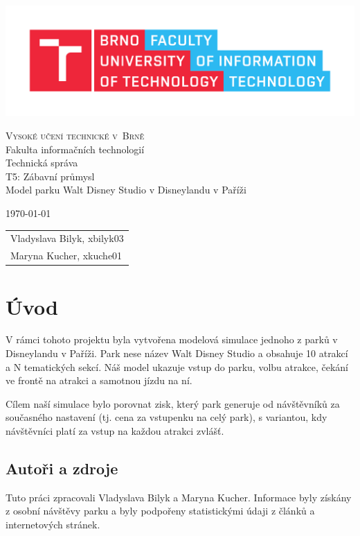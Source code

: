 \documentclass[a4paper,12pt]{article}
\begin{document}
\begin{center}
\includegraphics[width=1.0\textwidth]{fit.pdf} %

    \vspace{0.5cm} 
\Huge
\textsc{Vysoké učení technické v~Brně\\
}Fakulta informačních technologií\\
\Huge Technická správa \\
\LARGE T5: Zábavní průmysl \\
\LARGE  Model parku Walt Disney Studio v Disneylandu v Paříži\\

\Large 


\end{center}
{\Large \today \hfill
\begin{tabular}{l}
    Vladyslava Bilyk, xbilyk03 \\
    Maryna Kucher, xkuche01
\end{tabular}}
\thispagestyle{empty}

\newpage
\tableofcontents
\newpage

\section{Úvod}
V rámci tohoto projektu byla vytvořena modelová simulace jednoho z parků v Disneylandu v Paříži. Park nese název Walt Disney Studio a obsahuje 10 atrakcí a N tematických sekcí. Náš model ukazuje vstup do parku, volbu atrakce, čekání ve frontě na atrakci a samotnou jízdu na ní.

Cílem naší simulace bylo porovnat zisk, který park generuje od návštěvníků za současného nastavení (tj. cena za vstupenku na celý park), s variantou, kdy návštěvníci platí za vstup na každou atrakci zvlášť.

\subsection{Autoři a zdroje}
Tuto práci zpracovali Vladyslava Bilyk a Maryna Kucher. Informace byly získány z osobní návštěvy parku a byly podpořeny statistickými údaji z článků a internetových stránek.
\end{document}
